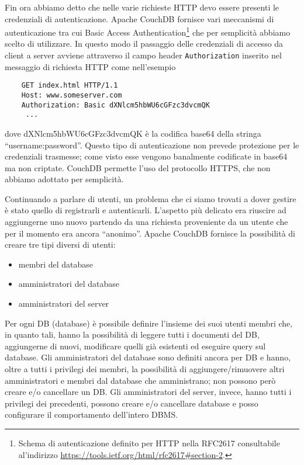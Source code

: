 		Fin ora abbiamo detto che nelle varie richieste HTTP devo essere presenti
		le credenziali di autenticazione. Apache CouchDB\texttrademark{} fornisce
		vari meccanismi di autenticazione tra cui Basic Access Authentication\footnote{
		Schema di autenticazione definito per HTTP nella RFC2617 consultabile al'indirizzo
		\url{https://tools.ietf.org/html/rfc2617#section-2}.}
		che per semplicità abbiamo scelto di utilizzare. In questo modo il
		passaggio delle credenziali di accesso da client a server avviene attraverso 
		il campo header \texttt{Authorization} inserito nel messaggio di richiesta HTTP 
		come nell'esempio 
		\begin{lstlisting}
	GET index.html HTTP/1.1
	Host: www.someserver.com
	Authorization: Basic dXNlcm5hbWU6cGFzc3dvcmQK
	 ...
		\end{lstlisting}
		dove dXNlcm5hbWU6cGFzc3dvcmQK è la codifica base64 della stringa 
		``username:password''.
		Questo tipo di autenticazione non prevede protezione per le credenziali 
		trasmesse; come visto esse vengono banalmente codificate in base64 ma non 
		criptate. CouchDB permette l'uso del protocollo HTTPS, che non abbiamo adottato 
		per semplicità.
		
		
		Continuando a parlare di utenti, un problema che ci siamo trovati a
		dover gestire è stato quello di	registrarli e autenticarli. L'aspetto
		più delicato era riuscire ad aggiungerne uno nuovo partendo da una
		richiesta proveniente da un utente che per il momento era ancora ``anonimo''.
		Apache CouchDB\texttrademark{} fornisce la possibilità di creare tre
		tipi diversi di utenti:
		\begin{itemize}
			\item membri del database
			\item amministratori del database
			\item amministratori del server
		\end{itemize}
		Per ogni DB (database) è possibile definire l'insieme dei suoi utenti
		membri che, in quanto tali, hanno la possibilità di leggere tutti i
		documenti del DB, aggiungerne di nuovi, modificare quelli già esistenti
		ed eseguire query sul database. 
		Gli amministratori del database sono definiti ancora per DB e hanno,
		oltre a tutti i privilegi dei membri, la possibilità di
		aggiungere/rimuovere altri amministratori e membri dal database che
		amministrano; non possono però creare e/o cancellare un DB.
		Gli amministratori del server, invece, hanno tutti i privilegi dei
		precedenti, possono creare e/o cancellare database e posso configurare
		il comportamento dell'intero DBMS.
		
